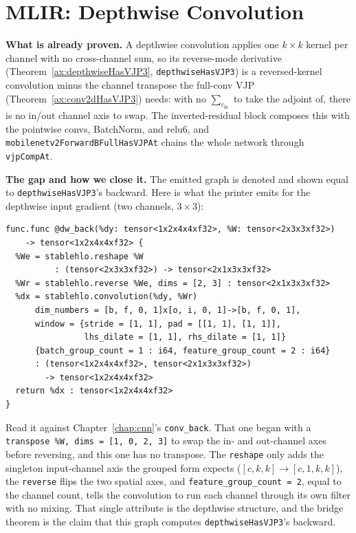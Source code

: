 \section{MLIR: Depthwise Convolution}

\noindent\textbf{What is already proven.} A depthwise convolution
applies one $k\times k$ kernel per channel with no cross-channel sum, so its
reverse-mode derivative (Theorem~\ref{ax:depthwiseHasVJP3},
\texttt{depthwiseHasVJP3}) is a reversed-kernel convolution minus the channel transpose the full-conv VJP (Theorem~\ref{ax:conv2dHasVJP3}) needs:
with no $\sum_{c_\text{in}}$ to take the adjoint of, there is no in/out
channel axis to swap. The inverted-residual block composes this with the
pointwise convs, BatchNorm, and relu6, and
\texttt{mobilenetv2ForwardBFullHasVJPAt} chains the whole network through
\texttt{vjpCompAt}.

\medskip\noindent\textbf{The gap and how we close it.} The emitted graph
is denoted and shown equal to \texttt{depthwiseHasVJP3}'s backward. Here
is what the printer emits for the depthwise input gradient (two channels,
$3\times3$):

\begin{verbatim}
func.func @dw_back(%dy: tensor<1x2x4x4xf32>, %W: tensor<2x3x3xf32>)
    -> tensor<1x2x4x4xf32> {
  %We = stablehlo.reshape %W
          : (tensor<2x3x3xf32>) -> tensor<2x1x3x3xf32>
  %Wr = stablehlo.reverse %We, dims = [2, 3] : tensor<2x1x3x3xf32>
  %dx = stablehlo.convolution(%dy, %Wr)
      dim_numbers = [b, f, 0, 1]x[o, i, 0, 1]->[b, f, 0, 1],
      window = {stride = [1, 1], pad = [[1, 1], [1, 1]],
                lhs_dilate = [1, 1], rhs_dilate = [1, 1]}
      {batch_group_count = 1 : i64, feature_group_count = 2 : i64}
      : (tensor<1x2x4x4xf32>, tensor<2x1x3x3xf32>)
        -> tensor<1x2x4x4xf32>
  return %dx : tensor<1x2x4x4xf32>
}
\end{verbatim}

\noindent Read it against Chapter~\ref{chap:cnn}'s \texttt{conv\_back}. That
one began with a \texttt{transpose \%W, dims = [1, 0, 2, 3]} to swap the in-
and out-channel axes before reversing, and this one has no transpose.
The \texttt{reshape} only adds the singleton input-channel axis the grouped
form expects ($[c,k,k] \to [c,1,k,k]$), the \texttt{reverse} flips the two
spatial axes, and \texttt{feature\_group\_count = 2}, equal to the channel
count, tells the convolution to run each channel through its own filter with
no mixing. That single attribute is the depthwise structure, and the
bridge theorem is the claim that this graph computes
\texttt{depthwiseHasVJP3}'s backward.

